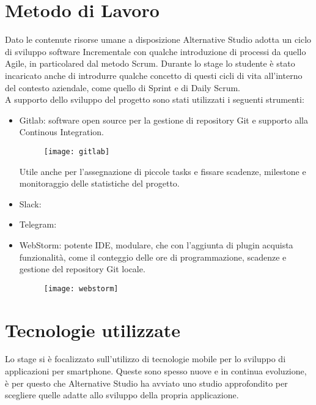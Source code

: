 
\section{Metodo di Lavoro}

Dato le contenute risorse umane a disposizione Alternative Studio adotta un ciclo di sviluppo software \gls{Incrementale} con qualche introduzione di processi da quello \gls{Agile}, in particolared dal metodo \gls{Scrum}. Durante lo stage lo studente è stato incaricato anche di introdurre qualche concetto di questi cicli di vita all'interno del contesto aziendale, come quello di \gls{Sprint} e di \gls{Daily Scrum}. \\
\noindent A supporto dello sviluppo del progetto sono stati utilizzati i seguenti strumenti:
\begin{itemize}
	\item Gitlab: software open source per la gestione di repository \gls{Git} e supporto alla Continous Integration.
	\begin{figure}[htbp]
	\begin{center}
	\texttt{[image: gitlab]}
	\end{center}
	\end{figure}
  Utile anche per l'assegnazione di piccole tasks e fissare scadenze, milestone e monitoraggio delle statistiche del progetto.
  \item Slack:
  \item Telegram:
  \item WebStorm: potente IDE, modulare, che con l'aggiunta di plugin acquista funzionalità, come il conteggio delle ore di programmazione, scadenze e gestione del repository \gls{Git} locale.
  \begin{figure}[htbp]
  \begin{center}
  \texttt{[image: webstorm]}
  \end{center}
  \end{figure}
\end{itemize}


\section{Tecnologie utilizzate}

Lo stage si è focalizzato sull'utilizzo di tecnologie mobile per lo sviluppo di applicazioni per smartphone. Queste sono spesso nuove e in continua evoluzione, è per questo che Alternative Studio ha avviato uno studio approfondito per scegliere quelle adatte allo sviluppo della propria applicazione. 

